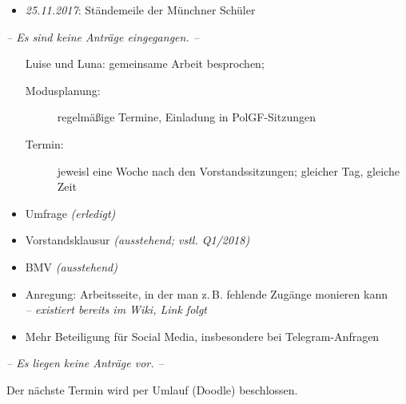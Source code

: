 \begin{Protokoll}

    \begin{itemize}
        \item \emph{25.11.2017}: Ständemeile der Münchner Schüler
    \end{itemize}
    
    \emph{-- Es sind keine Anträge eingegangen. --}
    
    \begin{itemize}
        \item[Luise und Luna:] gemeinsame Arbeit besprochen;
          \begin{description}
        \item[Modusplanung:] regelmäßige Termine, Einladung in PolGF-Sitzungen
        \item[Termin:] jeweisl eine Woche nach den Vorstandssitzungen; gleicher Tag, gleiche Zeit
        \end{description}
    \end{itemize}
    
    \begin{itemize}
        \item Umfrage \emph{(erledigt)}
        \item Vorstandsklausur \emph{(ausstehend; vstl. Q1/2018)}
        \item BMV \emph{(ausstehend)}
    \end{itemize}
    
       \begin{itemize}
        \item Anregung: Arbeitsseite, in der man z.\,B. fehlende Zugänge monieren kann \\
            \emph{-- existiert bereits im Wiki, Link folgt}
        \item Mehr Beteiligung für Social Media, insbesondere bei Telegram-Anfragen
     \end{itemize}
     
     
  		\emph{-- Es liegen keine Anträge vor. --}
    
    
		Der nächste Termin wird per Umlauf (Doodle) beschlossen.
\end{Protokoll}


